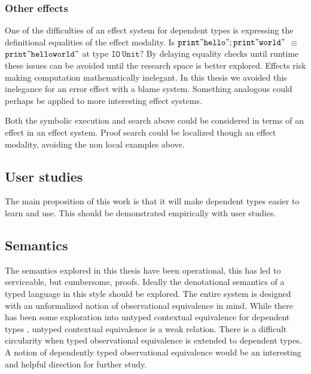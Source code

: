 \subsubsection{Other effects}

One of the difficulties of an effect system for dependent types is expressing the definitional equalities of the effect modality.
Is $\mathtt{print"hello";print"world"}$ $\equiv$ $\mathtt{print"helloworld"}$ at type $\mathtt{IO\ Unit}$?
By delaying equality checks until runtime these issues can be avoided until the research space is better explored.
Effects risk making computation mathematically inelegant.
In this thesis we avoided this inelegance for an error effect with a blame system.
Something analogous could perhaps be applied to more interesting effect systems.

Both the symbolic execution and search above could be considered in terms of an effect in an effect system.
Proof search could be localized though an effect modality, avoiding the non local examples above.

\subsection{User studies}

The main proposition of this work is that it will make dependent types easier to learn and use.
This should be demonstrated empirically with user studies.

\subsection{Semantics}

The semantics explored in this thesis have been operational, this has led to serviceable, but cumbersome, proofs.
Ideally the denotational semantics of a typed language in this style should be explored.
The entire system is designed with an unformalized notion of observational equivalence in mind.
While there has been some exploration into untyped contextual equivalence for dependent types \cite{sjoberg2015dependently,jia2010dependent}, untyped contextual equivalence is a weak relation.
There is a difficult circularity when typed observational equivalence is extended to dependent types.
A notion of dependently typed observational equivalence would be an interesting and helpful direction for further study.
